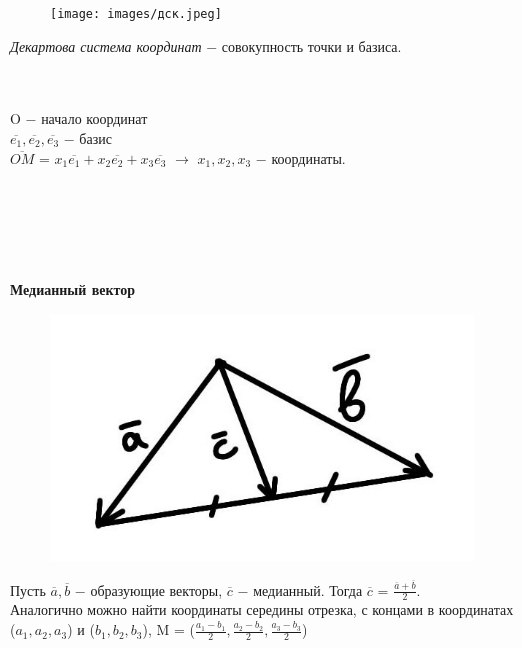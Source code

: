 \begin{figure}
	\texttt{[image: images/дск.jpeg]}
\end{figure}

\begin{definition}
	\textit{Декартова система координат} $-$ совокупность точки и базиса.
\end{definition}

\tab\\ \tab\\
O $-$ начало координат\\
$\overline{e_1}, \overline{e_2}, \overline{e_3}$ $-$ базис\\
$\overline{OM}$ = $x_1\overline{e_1} + x_2\overline{e_2} + x_3\overline{e_3}$ $\longrightarrow$ $x_1, x_2, x_3$ $-$ координаты.

\tab\\ \tab\\ \tab\\ \tab\\ \tab\\

\textbf{Медианный вектор}\\

\begin{figure}
	\includegraphics[width=0.8\linewidth]{images/медианныйвектор.jpeg}
\end{figure}

Пусть $\overline{a}, \overline{b}$ $-$ образующие векторы, $\overline{c}$ $-$ медианный. Тогда $\overline{c}$ = $\frac{\overline{a} + \overline{b}}{2}$.\\

Аналогично можно найти координаты середины отрезка, с концами в координатах ($a_1, a_2, a_3$) и ($b_1, b_2, b_3$), M = ($\frac{a_1 - b_1}{2}, \frac{a_2 - b_2}{2}, \frac{a_3 - b_3}{2}$)

\tab\\ \tab\\

